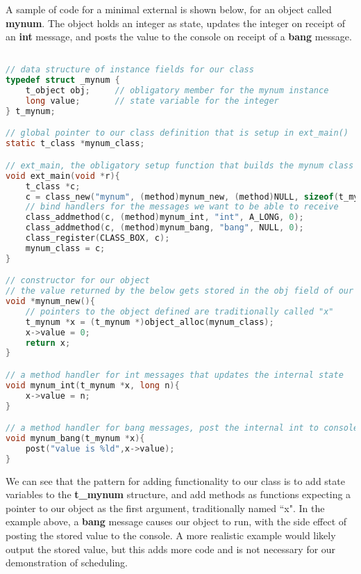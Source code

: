 \documentclass[acmsmall]{acmart}
\begin{document}
A sample of code for a minimal external is shown below,
for an object called \textbf{mynum}. The object holds an integer as state,
updates the integer on receipt of an \textbf{int} 
message, and posts the value to the console on receipt of a \textbf{bang}
message.

\begin{lstlisting}[language=C]

// data structure of instance fields for our class
typedef struct _mynum {
    t_object obj;     // obligatory member for the mynum instance 
    long value;       // state variable for the integer
} t_mynum;

// global pointer to our class definition that is setup in ext_main()
static t_class *mynum_class; 

// ext_main, the obligatory setup function that builds the mynum class
void ext_main(void *r){
    t_class *c;
    c = class_new("mynum", (method)mynum_new, (method)NULL, sizeof(t_mynum), 0L, 0);
    // bind handlers for the messages we want to be able to receive
    class_addmethod(c, (method)mynum_int, "int", A_LONG, 0);
    class_addmethod(c, (method)mynum_bang, "bang", NULL, 0);
    class_register(CLASS_BOX, c);
    mynum_class = c;
}

// constructor for our object
// the value returned by the below gets stored in the obj field of our t_mynum struct
void *mynum_new(){
    // pointers to the object defined are traditionally called "x"
    t_mynum *x = (t_mynum *)object_alloc(mynum_class);
    x->value = 0;
    return x;
}

// a method handler for int messages that updates the internal state
void mynum_int(t_mynum *x, long n){
    x->value = n;
}

// a method handler for bang messages, post the internal int to console
void mynum_bang(t_mynum *x){
    post("value is %ld",x->value);
}

\end{lstlisting}


We can see that the pattern for adding functionality to our class is to
add state variables to the \textbf{t\_mynum} structure, and add methods as
functions expecting a pointer to our object as the first argument,
traditionally named ``x". In the example above, a \textbf{bang} message causes our
object to run, with the side effect of posting the stored value to the console. A more
realistic example would likely output the stored value, but this adds more code
and is not necessary for our demonstration of scheduling.
\end{document}
